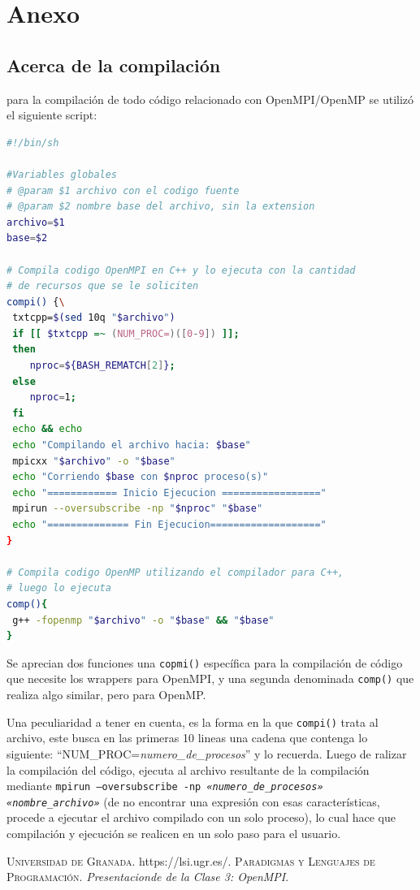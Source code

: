 \documentclass{article}
\begin{document}
\newpage
\section{Anexo}
\subsection{Acerca de la compilaci\'on}
\label{an:compilacion}
para la compilación de todo código relacionado con OpenMPI/OpenMP se utilizó el
siguiente script:

\begin{lstlisting}[language=bash, caption={Script de compilaci\'on}]
#!/bin/sh

#Variables globales
# @param $1 archivo con el codigo fuente
# @param $2 nombre base del archivo, sin la extension
archivo=$1
base=$2

# Compila codigo OpenMPI en C++ y lo ejecuta con la cantidad
# de recursos que se le soliciten
compi() {\
 txtcpp=$(sed 10q "$archivo")
 if [[ $txtcpp =~ (NUM_PROC=)([0-9]) ]];
 then
    nproc=${BASH_REMATCH[2]};
 else
    nproc=1;
 fi
 echo && echo
 echo "Compilando el archivo hacia: $base"
 mpicxx "$archivo" -o "$base"
 echo "Corriendo $base con $nproc proceso(s)"
 echo "============ Inicio Ejecucion ================="
 mpirun --oversubscribe -np "$nproc" "$base"
 echo "============== Fin Ejecucion==================="
}

# Compila codigo OpenMP utilizando el compilador para C++,
# luego lo ejecuta
comp(){
 g++ -fopenmp "$archivo" -o "$base" && "$base"
}
\end{lstlisting}

Se aprecian dos funciones una \texttt{copmi()} espec\'ifica para la compilaci\'on
de c\'odigo que necesite los wrappers para OpenMPI, y una segunda denominada
\texttt{comp()} que realiza algo similar, pero para OpenMP.

Una peculiaridad a tener en cuenta, es la forma en la que \texttt{compi()}
trata al archivo, este busca en las primeras 10 lineas una cadena que contenga
lo siguiente: ``NUM\_PROC=\textit{numero\_de\_procesos}'' y lo recuerda. Luego de
ralizar la compilaci\'on del c\'odigo, ejecuta al archivo resultante de
la compilaci\'on mediante \texttt{mpirun --oversubscribe -np \textit{«numero\_de\_procesos»
«nombre\_archivo»}} (de no encontrar una expresi\'on con esas caracter\'isticas,
procede a ejecutar el archivo compilado con un solo proceso), lo cual hace que compilaci\'on y
ejecuci\'on se realicen en un solo paso para el usuario.


\newpage
\begin{thebibliography}{99}
	 \textsc{Universidad de
Granada}. https://lsi.ugr.es/.
	\textsc{Paradigmas y
Lenguajes de Programaci\'on}. \textit{Presentacionde de la Clase 3: OpenMPI}.
\end{thebibliography}
\end{document}
